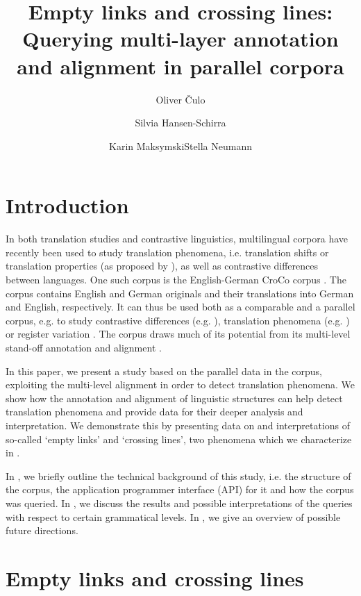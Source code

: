 \documentclass[output=paper]{LSP/langsci}
\author{Oliver Čulo\and 
Silvia Hansen-Schirra\and 
Karin Maksymski\affiliation{Universität Mainz, Germersheim}\lastand Stella Neumann\affiliation{IFAAR, RWTH Aachen}
}
\title{Empty links and crossing lines: Querying multi-layer annotation and alignment in parallel corpora}
\begin{document}




\section{Introduction}\label{sec:culo:1}

In both translation studies and contrastive linguistics, multilingual corpora have recently been used to study translation phenomena, i.e. translation shifts or translation properties (as proposed by \citealt{Baker1993, Baker1995, Toury1995}), as well as contrastive differences between languages. One such corpus is the English-German CroCo corpus \citep{Hansen-SchirraEtAlfc}. The corpus contains English and German originals and their translations into German and English, respectively. It can thus be used both as a comparable and a parallel corpus, e.g. to study contrastive differences (e.g. \citealt{Steiner2008}), translation phenomena (e.g. \citealt{CuloEtAl2008,Hansen-SchirraEtAl2007}) or register variation \citep{Neumann2008}. The corpus draws much of its potential from its multi-level stand-off annotation and alignment \citep{Hansen-SchirraEtAl2006}.

In this paper, we present a study based on the parallel data in the corpus, exploiting the multi-level alignment in order to detect translation phenomena. We show how the annotation and alignment of linguistic structures can help detect translation phenomena and provide data for their deeper analysis and interpretation. We demonstrate this by presenting data on and interpretations of so-called `empty links' and `crossing lines', two phenomena which we characterize in .

In , we briefly outline the technical background of this study, i.e. the structure of the corpus, the application programmer interface (API) for it and how the corpus was queried. In , we discuss the results and possible interpretations of the queries with respect to certain grammatical levels. In , we give an overview of possible future directions. 

\section{Empty links and crossing lines}\label{sec:culo:2}
\end{document}
